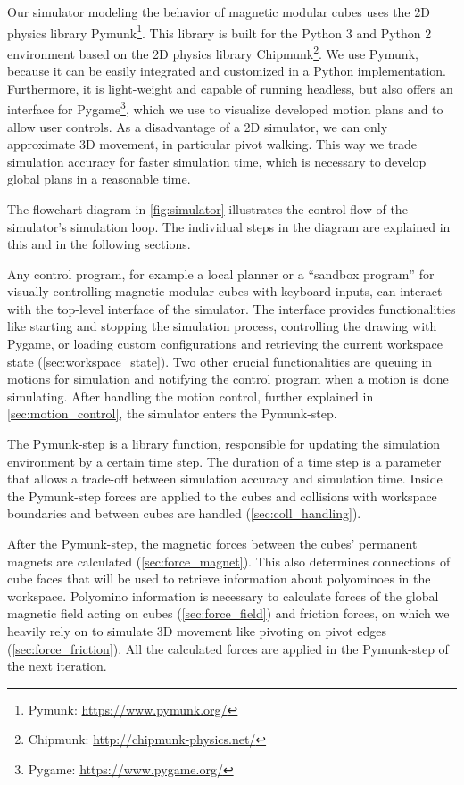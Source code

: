 Our simulator modeling the behavior of magnetic modular cubes uses the 2D physics library Pymunk\footnote{Pymunk: \url{https://www.pymunk.org/}}.
This library is built for the Python 3 and Python 2 environment based on the 2D physics library Chipmunk\footnote{Chipmunk: \url{http://chipmunk-physics.net/}}.
We use Pymunk, because it can be easily integrated and customized in a Python implementation.
Furthermore, it is light-weight and capable of running headless, but also offers an interface for Pygame\footnote{Pygame: \url{https://www.pygame.org/}}, which we use to visualize developed motion plans and to allow user controls.
As a disadvantage of a 2D simulator, we can only approximate 3D movement, in particular pivot walking.
This way we trade simulation accuracy for faster simulation time, which is necessary to develop global plans in a reasonable time.

The flowchart diagram in \autoref{fig:simulator} illustrates the control flow of the simulator's simulation loop.
The individual steps in the diagram are explained in this and in the following sections.

Any control program, for example a local planner or a ``sandbox program'' for visually controlling magnetic modular cubes with keyboard inputs, can interact with the top-level interface of the simulator.
The interface provides functionalities like starting and stopping the simulation process, controlling the drawing with Pygame, or loading custom configurations and retrieving the current workspace state (\autoref{sec:workspace_state}).
Two other crucial functionalities are queuing in motions for simulation and notifying the control program when a motion is done simulating.
After handling the motion control, further explained in \autoref{sec:motion_control}, the simulator enters the Pymunk-step.

The Pymunk-step is a library function, responsible for updating the simulation environment by a certain time step.
The duration of a time step is a parameter that allows a trade-off between simulation accuracy and simulation time. 
Inside the Pymunk-step forces are applied to the cubes and collisions with workspace boundaries and between cubes are handled (\autoref{sec:coll_handling}).

After the Pymunk-step, the magnetic forces between the cubes' permanent magnets are calculated (\autoref{sec:force_magnet}).
This also determines connections of cube faces that will be used to retrieve information about polyominoes in the workspace.
Polyomino information is necessary to calculate forces of the global magnetic field acting on cubes (\autoref{sec:force_field}) and friction forces, on which we heavily rely on to simulate 3D movement like pivoting on pivot edges (\autoref{sec:force_friction}).
All the calculated forces are applied in the Pymunk-step of the next iteration.

